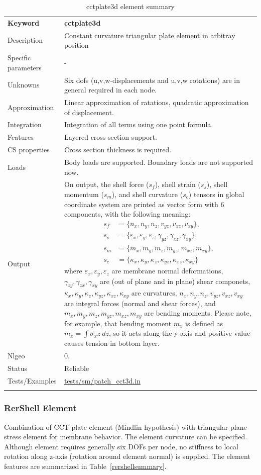 \documentclass[a4paper]{article}
\newcommand{\param}[1]{\texttt{#1}} %
\newcommand{\templabel}{}%
\newcommand{\tempcaption}{}%
\newcounter{nelpar}
\newenvironment{elementsummary}[5]{%
  \gdef\tempcaption{#4}%
  \gdef\templabel{#5}%
  \setcounter{nelpar}{0}%
  \begin{center} %
    \begin{table}[!htb] %
      \begin{tabular}{|l|p{9cm}|}\hline %
        {\bf Keyword} & \bf{#1}\\ %
        {Description} & {#2}\\ %
        {Specific parameters} & {#3}\\ \hline %
}{
  \\ \hline %
      \end{tabular}%
      \caption{\tempcaption}%
      \label{\templabel}%
    \end{table}%
  \end{center}%
}
\newcommand{\elementParam}[1]{%
  \ifthenelse{\value{nelpar}>0} %
             {&{#1}}%
             {\setcounter{nelpar}{1}Parameters&{#1}}%
             \\%
}
\newcommand{\elementDescription}[2]{{#1} & {#2}\\}
\begin{document}
\begin{elementsummary}{cctplate3d}{Constant curvature triangular plate element in arbitray position}{-}{cctplate3d element summary}{cctplate3dsummary}
\elementDescription{Unknowns}{Six dofs (u,v,w-displacements and u,v,w rotations) are in general required in each node.}
\elementDescription{Approximation}{Linear approximation of ratations, quadratic approximation of displacement.}
\elementDescription{Integration}{Integration of all terms using one point formula.}
\elementDescription{Features}{Layered cross section support.}
\elementDescription{CS properties}{Cross section thickness is required.}
\elementDescription{Loads}{Body loads are supported. Boundary loads are not supported now.}
\elementDescription{Output}{On output, the shell force ($s_f$), shell strain ($s_s$), shell momentum ($s_m$), and shell curvature ($s_c$) tensors in global coordinate system are printed as vector form with 6 components, with the following meaning:
\begin{align*}
s_f &=\{n_x, n_y, n_z, v_{yz}, v_{xz}, v_{xy}\},\\
s_s &=\{\varepsilon_x, \varepsilon_y, \varepsilon_z, \gamma_{yz}, \gamma_{xz}, \gamma_{xy}\},\\
s_m &=\{m_x, m_y, m_z, m_{yz}, m_{xz}, m_{xy}\},\\
s_c &=\{\kappa_x, \kappa_y, \kappa_z, \kappa_{yz}, \kappa_{xz}, \kappa_{xy}\}
\end{align*}
where $\varepsilon_x, \varepsilon_y, \varepsilon_z$ are membrane normal deformations, $\gamma_{zy}, \gamma_{zx}, \gamma_{xy}$ are (out of plane and in plane) shear componets, $\kappa_x, \kappa_y, \kappa_z, \kappa_{yz}, \kappa_{xz}, \kappa_{xy}$ are curvatures, $n_x, n_y, n_z, v_{yz}, v_{xz}, v_{xy}$ are integral forces (normal and shear forces), and $m_x, m_y, m_z, m_{yz}, m_{xz}, m_{xy}$ are bending moments. 
Please note, for example, that bending moment $m_x$ is defined as $m_x=\int \sigma_x z\ dz$, so it acts along the y-axis and positive value causes tension in bottom layer.}
\elementDescription{Nlgeo}{0.}
\elementDescription{Status}{Reliable}
\elementDescription{Tests/Examples}{\href{https://github.com/oofem/oofem/blob/devel/tests/sm/patch\_cct3d.in}{tests/sm/patch\_cct3d.in}}
\end{elementsummary}


\subsubsection {RerShell Element}
Combination of CCT plate element (Mindlin hypothesis) with triangular plane stress element
for membrane behavior. The element curvature can be specified. 
Although element requires generally six DOFs per node, no stiffness to
local rotation along z-axis (rotation around element normal) is supplied. 
The element features are summarized in Table~\ref{rershellsummary}.
\end{document}
